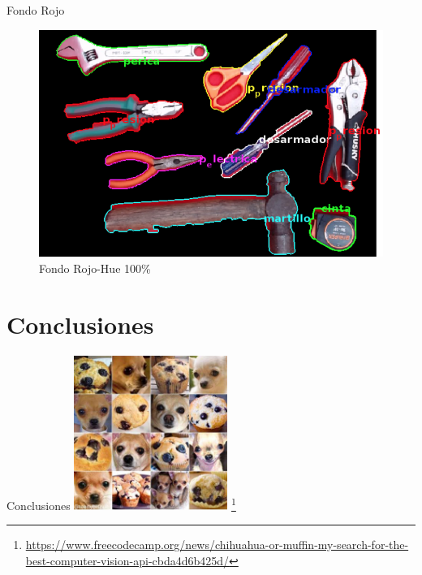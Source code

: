 \documentclass[
  24pt, %
]{beamer}
\begin{document}
\begin{frame}{Fondo Rojo}
  \begin{figure}[h]
  \centering
  \includegraphics[width=\textwidth]{resultados_colores/resultado_rojo_hue_1}
  \caption{Fondo Rojo-Hue 100\%}
  \end{figure}
\end{frame}

\section{Conclusiones}
\begin{frame}{Conclusiones}
  \centering
  \includegraphics[width=5cm]{chihuahua}
  \footnote{\url{https://www.freecodecamp.org/news/chihuahua-or-muffin-my-search-for-the-best-computer-vision-api-cbda4d6b425d/}}
\end{frame}

%  
%  
\end{document}
